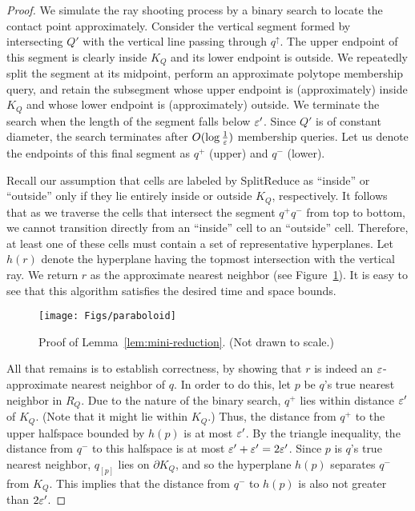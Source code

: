 \documentclass[11pt]{article}   \usepackage[letterpaper,hmargin=2.1cm,vmargin=3cm]{geometry}
\newcommand{\inv}[1]{\frac{1}{#1}}
\newcommand{\alg}{\textrm{SplitReduce}}
\begin{document}
\begin{proof}
We simulate the ray shooting process by a binary search to locate the contact point approximately. Consider the vertical segment formed by intersecting $Q'$ with the vertical line passing through $q^{\uparrow}$. The upper endpoint of this segment is clearly inside $K_Q$ and its lower endpoint is outside. We repeatedly split the segment at its midpoint, perform an approximate polytope membership query, and retain the subsegment whose upper endpoint is (approximately) inside $K_Q$ and whose lower endpoint is (approximately) outside. We terminate the search when the length of the segment falls below $\varepsilon'$. Since $Q'$ is of constant diameter, the search terminates after $O(\log \inv{\eps})$ membership queries. Let us denote the endpoints of this final segment as $q^+$ (upper) and $q^-$ (lower).

Recall our assumption that cells are labeled by {\alg} as ``inside'' or ``outside'' only if they lie entirely inside or outside $K_Q$, respectively. It follows that as we traverse the cells that intersect the segment $q^+ q^-$ from top to bottom, we cannot transition directly from an ``inside'' cell to an ``outside'' cell. Therefore, at least one of these cells must contain a set of representative hyperplanes. Let $h(r)$ denote the hyperplane having the topmost intersection with the vertical ray. We return $r$ as the approximate nearest neighbor (see Figure~\ref{fig:paraboloid}). It is easy to see that this algorithm satisfies the desired time and space bounds. 

\begin{figure}[htbp]
  \centerline{\texttt{[image: Figs/paraboloid]}}
  \caption{Proof of Lemma~\ref{lem:mini-reduction}. (Not drawn to scale.)}
  \label{fig:paraboloid}
\end{figure}


All that remains is to establish correctness, by showing that $r$ is indeed an $\varepsilon$-approximate nearest neighbor of $q$. In order to do this, let $p$ be $q$'s true nearest neighbor in $R_Q$. Due to the nature of the binary search, $q^+$ lies within distance $\varepsilon'$ of $K_Q$. (Note that it might lie within $K_Q$.) Thus, the distance from $q^+$ to the upper halfspace bounded by $h(p)$ is at most $\varepsilon'$. By the triangle inequality, the distance from $q^-$ to this halfspace is at most $\varepsilon' + \varepsilon' = 2 \varepsilon'$. Since $p$ is $q$'s true nearest neighbor, $q_{[p]}$ lies on $\partial K_Q$, and so the hyperplane $h(p)$ separates $q^-$ from $K_Q$. This implies that the distance from $q^-$ to $h(p)$ is also not greater than $2 \varepsilon'$. 


\end{proof}
\end{document}
